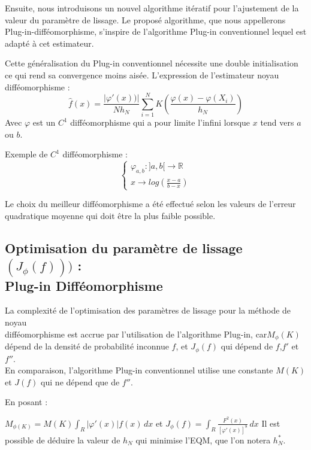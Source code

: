 Ensuite, nous introduisons un nouvel algorithme itératif pour l’ajustement de la valeur du paramètre de lissage. Le proposé algorithme, que nous appellerons Plug-in-difféomorphisme, s’inspire de l’algorithme Plug-in conventionnel lequel est adapté à cet estimateur.

Cette généralisation du Plug-in conventionnel nécessite une double initialisation ce qui rend sa convergence moins aisée.
L’expression de l’estimateur noyau difféomorphisme :
\begin{equation}
{\hat f}(x)= \frac{\left | \varphi '(x))  \right |}{Nh_N}\sum_{i=1}^{N}K(\frac{\varphi (x) - \varphi(X_i)}{h_N})
\end{equation}
Avec $\varphi$ est un $C^1$  difféomorphisme qui a pour limite l’infini lorsque $x$ tend vers $a$ ou $b$.

Exemple de $C^1$  difféomorphisme :
\newline
\begin{equation}
    \begin{cases}
\varphi _{a,b} : ]a,b[ \longrightarrow \mathbb{R} \\ x\longrightarrow log(\frac{x-a}{b-x})
\end{cases}
\end{equation}

Le choix du meilleur difféomorphisme a été effectué selon les valeurs de l’erreur quadratique moyenne qui doit être la plus faible possible.

\subsection{Optimisation du paramètre de lissage $(J_\phi (f)))$ : \\Plug-in Difféomorphisme }
La complexité de l'optimisation des paramètres de lissage pour la méthode de noyau \\difféomorphisme est accrue par l'utilisation de l'algorithme Plug-in, car$M_\phi(K)$ dépend de la densité de probabilité inconnue $f$, et $J_\phi(f)$ qui dépend de $f$,$f'$ et $f''$.\\En comparaison, l'algorithme Plug-in conventionnel utilise une constante $M(K)$ et $J(f)$ qui ne dépend que de $f''$.

En posant :		

$M_{\phi (K)} = M(K) \int _R \left|\varphi '(x) \right| f(x) \, dx$ 
\newline
et 
\newline
$J_{\phi}(f) = \int_{R} \frac{F^2 (x)}{[\varphi'(x)]^8} \, dx$
\newline
Il est possible de déduire la valeur de $h_N$ qui minimise l’EQM, que l’on notera $h^*_N$.

